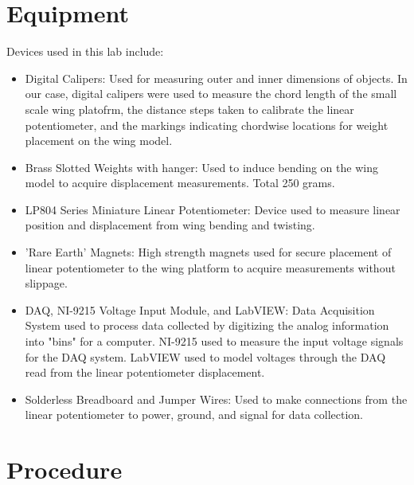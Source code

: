 \documentclass{article}
\begin{document}
\section{Equipment}
Devices used in this lab include:
\begin{itemize}

\item Digital Calipers: Used for measuring outer and inner dimensions of objects. In our case, digital calipers were used to measure the chord length of the small scale wing platofrm, the distance steps taken to calibrate the linear potentiometer, and the markings indicating chordwise locations for weight placement on the wing model.
\vspace{2.5mm}

\item Brass Slotted Weights with hanger: Used to induce bending on the wing model to acquire displacement measurements. Total 250 grams.
\vspace{2.5mm}

\item LP804 Series Miniature Linear Potentiometer: Device used to measure linear position and displacement from wing bending and twisting.
\vspace{2.5mm}

\item 'Rare Earth' Magnets: High strength magnets used for secure placement of linear potentiometer to the wing platform to acquire measurements without slippage.
\vspcae{2.5mm}

\item DAQ, NI-9215 Voltage Input Module, and LabVIEW: Data Acquisition System used to process data collected by digitizing the analog information into "bins" for a computer. NI-9215 used to measure the input voltage signals for the DAQ system. LabVIEW used to model voltages through the DAQ read from the linear potentiometer displacement.
\vspace{2.5mm}

\item Solderless Breadboard and Jumper Wires: Used to make connections from the linear potentiometer to power, ground, and signal for data collection.

\end{itemize}

\section{Procedure}
\end{document}
